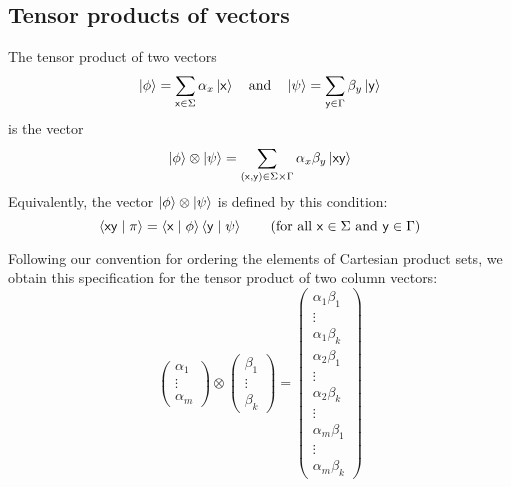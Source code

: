 \subsection{Tensor products of vectors}
The tensor product of two vectors
\begin{equation*}
    \ket{\phi}=\sum\limits_{\mathsf{x}\in\Sigma}\alpha_x\ket{\mathsf{x}} \quad \text{and} \quad \ket{\psi}=\sum\limits_{\mathsf{y}\in\Gamma}\beta_y\ket{\mathsf{y}}
\end{equation*}
is the vector
\begin{equation*}
    \ket{\phi}\otimes\ket{\psi}=\sum\limits_{(\mathsf{x},\mathsf{y})\in\Sigma\times\Gamma}\alpha_x\beta_y\ket{\mathsf{xy}}
\end{equation*}
Equivalently, the vector $\ket{\phi}\otimes\ket{\psi}$ is defined by this condition:
\begin{equation*}
    \braket{\mathsf{xy}\mid\pi}=\braket{\mathsf{x}\mid\phi}\braket{\mathsf{y}\mid\psi} \qquad \text{(for all } \mathsf{x}\in\Sigma \text{ and } \mathsf{y}\in\Gamma \text{)}
\end{equation*}


Following our convention for ordering the elements of Cartesian product sets, we obtain this specification for the tensor product of two column vectors:
\begin{equation*}
    \begin{pmatrix}
        \alpha_1 \\
        \vdots \\
        \alpha_m
    \end{pmatrix}
    \otimes
    \begin{pmatrix}
        \beta_1 \\
        \vdots \\
        \beta_k
    \end{pmatrix}
    =
    \begin{pmatrix}
        \alpha_1\beta_1 \\
        \vdots \\
        \alpha_1\beta_k \\
        \alpha_2\beta_1 \\
        \vdots \\
        \alpha_2\beta_k \\
        \vdots \\
        \alpha_m\beta_1 \\
        \vdots \\
        \alpha_m\beta_k
    \end{pmatrix}
\end{equation*}

